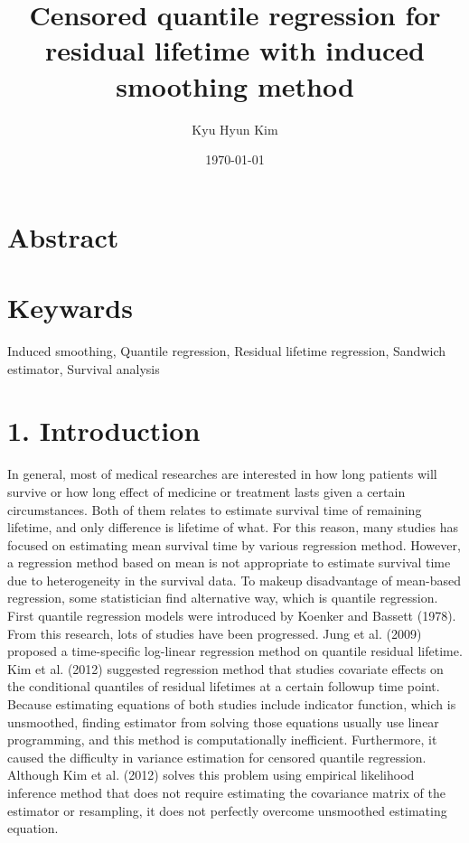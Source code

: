 \documentclass[12pt]{article}
\title{Censored quantile regression for residual lifetime with induced smoothing method}
\author{Kyu Hyun Kim}
\date{\today}
\begin{document}
	\maketitle
	
\section{Abstract}

\section{Keywards} Induced smoothing, Quantile regression, Residual lifetime regression, Sandwich estimator, Survival analysis

\section{1. Introduction}
	In general, most of medical researches are interested in how long patients will survive or how long effect of medicine or treatment lasts given a certain circumstances. Both of them relates to estimate survival time of remaining lifetime, and only difference is lifetime of what. For this reason, many studies has focused on estimating mean survival time by various regression method. However, a regression method based on mean is not appropriate to estimate survival time due to heterogeneity in the survival data. To makeup disadvantage of mean-based regression, some statistician find alternative way, which is quantile regression.\\
	
	First quantile regression models were introduced by Koenker and Bassett (1978). From this research, lots of studies have been progressed. Jung et al. (2009) proposed a time-specific log-linear regression method on quantile residual lifetime. Kim et al. (2012) suggested regression method that studies covariate effects on the conditional quantiles of residual lifetimes at a certain followup time point. Because estimating equations of both studies include indicator function, which is unsmoothed, finding estimator from solving those equations usually use linear programming, and this method is computationally inefficient. Furthermore, it caused the difficulty in variance estimation for censored quantile regression. Although Kim et al. (2012) solves this problem using empirical likelihood inference method that does not require estimating the covariance matrix of the estimator or resampling, it does not perfectly overcome unsmoothed estimating equation.\\
	 
\end{document}
